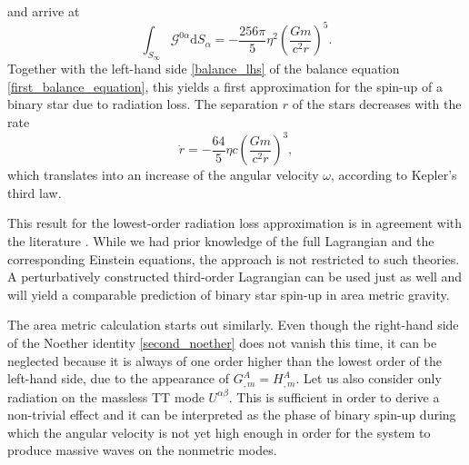 and arrive at
\begin{equation}
  \int_{S_\infty}\mathcal G^{0\alpha}\mathrm dS_\alpha = -\frac{256\pi}{5}\eta^2\left(\frac{Gm}{c^2r}\right)^5.
\end{equation}
Together with the left-hand side \eqref{balance_lhs} of the balance equation \eqref{first_balance_equation}, this yields a first approximation for the spin-up of a binary star due to radiation loss. The separation $r$ of the stars decreases with the rate
\begin{equation}
  \dot r = -\frac{64}{5}\eta c\left(\frac{Gm}{c^2r}\right)^3,
\end{equation}
which translates into an increase of the angular velocity $\omega$, according to Kepler's third law.

This result for the lowest-order radiation loss approximation is in agreement with the literature \cite{poisson}. While we had prior knowledge of the full Lagrangian and the corresponding Einstein equations, the approach is not restricted to such theories. A perturbatively constructed third-order Lagrangian can be used just as well and will yield a comparable prediction of binary star spin-up in area metric gravity.

The area metric calculation starts out similarly. Even though the right-hand side of the Noether identity \eqref{second_noether} does not vanish this time, it can be neglected because it is always of one order higher than the lowest order of the left-hand side, due to the appearance of $G^A_{,m} = H^A_{,m}$. Let us also consider only radiation on the massless TT mode $U^{\alpha\beta}$. This is sufficient in order to derive a non-trivial effect and it can be interpreted as the phase of binary spin-up during which the angular velocity is not yet high enough in order for the system to produce massive waves on the nonmetric modes.

